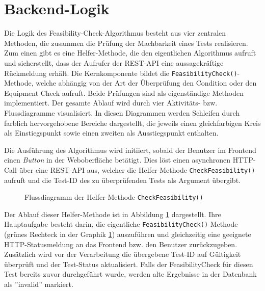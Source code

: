 \section{Backend-Logik}

Die Logik des Feasibility-Check-Algorithmus besteht aus vier zentralen Methoden, die zusammen die Prüfung der Machbarkeit eines Tests realisieren. Zum einen gibt es eine Helfer-Methode, die den eigentlichen Algorithmus aufruft und sicherstellt, dass der Aufrufer der REST-API eine aussagekräftige Rückmeldung erhält. Die Kernkomponente bildet die \texttt{FeasibilityCheck()}-Methode, welche abhängig von der Art der Überprüfung den Condition oder den Equipment Check aufruft. Beide Prüfungen sind als eigenständige Methoden implementiert. Der gesamte Ablauf wird durch vier Aktivitäts- bzw. Flussdiagramme visualisiert. In diesen Diagrammen werden Schleifen durch farblich hervorgehobene Bereiche dargestellt, die jeweils einen gleichfarbigen Kreis als Einstiegspunkt sowie einen zweiten als Ausstiegspunkt enthalten.

Die Ausführung des Algorithmus wird initiiert, sobald der Benutzer im Frontend einen \textit{Button} in der Weboberfläche betätigt. Dies löst einen asynchronen HTTP-Call über eine REST-API aus, welcher die Helfer-Methode \texttt{CheckFeasibility()} aufruft und die Test-ID des zu überprüfenden Tests als Argument übergibt.

\begin{figure}[!htbp]
    \centering
    \caption{Flussdiagramm der Helfer-Methode \texttt{CheckFeasibility()}}
    \label{fig:feasibility-http-call-method}
\end{figure}

Der Ablauf dieser Helfer-Methode ist in Abbildung \ref{fig:feasibility-http-call-method} dargestellt. Ihre Hauptaufgabe besteht darin, die eigentliche \texttt{FeasibilityCheck()}-Methode (grünes Rechteck in der Graphik \ref{fig:feasibility-http-call-method}) auszuführen und gleichzeitig eine geeignete HTTP-Statusmeldung an das Frontend bzw. den Benutzer zurückzugeben. Zusätzlich wird vor der Verarbeitung die übergebene Test-ID auf Gültigkeit überprüft und der Test-Status aktualisiert. Falls der FeasibilityCheck für diesen Test bereits zuvor durchgeführt wurde, werden alte Ergebnisse in der Datenbank als ''invalid'' markiert.


